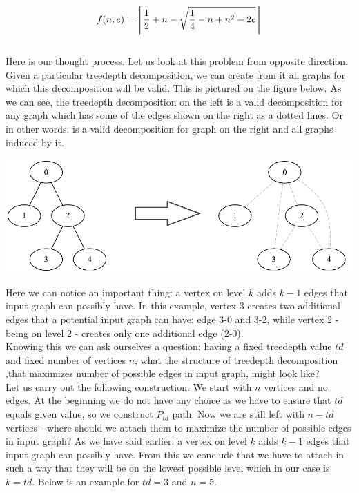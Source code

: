 \documentclass[a4paper]{article}
\DeclarePairedDelimiter\ceil{\lceil}{\rceil}
\begin{document}
	\begin{equation}
	f(n,e)=\ceil*{\frac{1}{2}+n-\sqrt{\frac{1}{4}-n+n^2-2e}}
	\end{equation}
	\\Here is our thought process.
	Let us look at this problem from opposite direction. Given a particular treedepth decomposition, we can create from it all graphs for which this decomposition will be valid. This is pictured on the figure below. As we can see, the treedepth decomposition on the left is a valid decomposition for any graph which has some of the edges shown on the right as a dotted lines. Or in other words: is a valid decomposition for graph on the right and all graphs induced by it. %
	\begin{center}
		\includegraphics[width=\textwidth]{transform.png}
	\end{center}
	Here we can notice an important thing: a vertex on level $k$ adds $k-1$ edges that input graph can possibly have. In this example, vertex 3 creates two additional edges that a potential input graph can have: edge 3-0 and 3-2, while vertex 2 - being on level 2 - creates only one additional edge (2-0).\\ 
	Knowing this we can ask ourselves a question: having a fixed treedepth value $td$ and fixed number of vertices $n$, what the structure of treedepth decomposition ,that maximizes number of possible edges in input graph, might look like?\\
	Let us carry out the following construction. We start with $n$ vertices and no edges.
	At the beginning we do not have any choice as we have to ensure that $td$ equals given value, so we construct $P_{td}$ path. Now we are still left with $n-td$ vertices - where should we attach them to maximize the number of possible edges in input graph? As we have said earlier: a vertex on level $k$ adds $k-1$ edges that input graph can possibly have. From this we conclude that we have to attach in such a way that they will be on the lowest possible level which in our case is $k=td$. Below is an example for $td=3$ and $n=5$.
\end{document}
